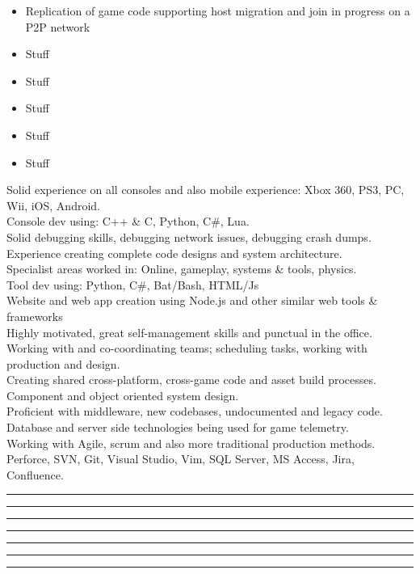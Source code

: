 \documentclass[a4paper]{res}
\newcommand{\setrule}[1]{\rule{#1}{1mm}}
\newcommand{\fibrule}[2]{ \hspace{#1}  \setrule{#2} \setrule{21mm} \setrule{13mm} \setrule{8mm} \setrule{5mm} \setrule{3mm} \setrule{2mm}  \vspace{-.52in} }
\begin{document}
\begin{resume}
\begin{itemize}

\item Replication of game code supporting host migration and join in progress on a P2P network
\item Stuff
\item Stuff
\item Stuff
\item Stuff
\item Stuff

\end{itemize}

Solid experience on all consoles and also mobile experience: Xbox 360, PS3, PC, Wii, iOS, Android. \\
Console dev using: C++ \& C, Python, C\#, Lua. \\
Solid debugging skills, debugging network issues, debugging crash dumps. \\
Experience creating complete code designs and system architecture. \\
Specialist areas worked in: Online, gameplay, systems \& tools, physics. \\
Tool dev using: Python, C\#, Bat/Bash, HTML/Js \\
Website and web app creation using Node.js and other similar web tools \& frameworks \\
Highly motivated, great self-management skills and punctual in the office. \\
Working with and co-coordinating teams; scheduling tasks, working with production and design.  \\
Creating shared cross-platform, cross-game code and asset build processes. \\
Component and object oriented system design. \\
Proficient with middleware, new codebases, undocumented and legacy code.  \\
Database and server side technologies being used for game telemetry.\\
Working with Agile, scrum and also more traditional production methods. \\
Perforce, SVN, Git, Visual Studio, Vim, SQL Server, MS Access, Jira, Confluence.

\vspace{.15in}

\fibrule{0.9in}{3.0in}

\end{resume}
\end{document}
